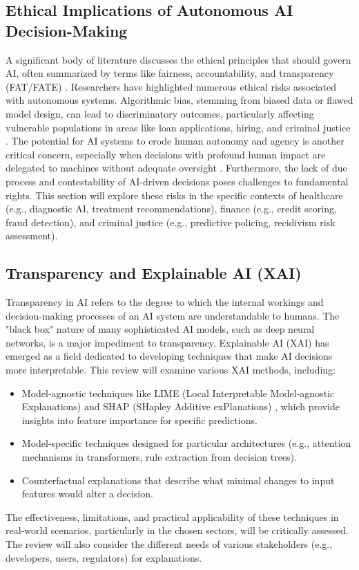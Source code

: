 \documentclass[english]{hogent-article}
\begin{document}
\subsection{Ethical Implications of Autonomous AI Decision-Making}
A significant body of literature discusses the ethical principles that should govern AI, often summarized by terms like fairness, accountability, and transparency (FAT/FATE) \autocite{Floridi2018}. Researchers have highlighted numerous ethical risks associated with autonomous systems. Algorithmic bias, stemming from biased data or flawed model design, can lead to discriminatory outcomes, particularly affecting vulnerable populations in areas like loan applications, hiring, and criminal justice \autocite{Noble2018}. The potential for AI systems to erode human autonomy and agency is another critical concern, especially when decisions with profound human impact are delegated to machines without adequate oversight \autocite{EuropeanCommission2021AIAct}. Furthermore, the lack of due process and contestability of AI-driven decisions poses challenges to fundamental rights. This section will explore these risks in the specific contexts of healthcare (e.g., diagnostic AI, treatment recommendations), finance (e.g., credit scoring, fraud detection), and criminal justice (e.g., predictive policing, recidivism risk assessment).

\subsection{Transparency and Explainable AI (XAI)}
Transparency in AI refers to the degree to which the internal workings and decision-making processes of an AI system are understandable to humans. The "black box" nature of many sophisticated AI models, such as deep neural networks, is a major impediment to transparency. Explainable AI (XAI) has emerged as a field dedicated to developing techniques that make AI decisions more interpretable. This review will examine various XAI methods, including:
\begin{itemize}
    \item Model-agnostic techniques like LIME (Local Interpretable Model-agnostic Explanations) \autocite{Ribeiro2016} and SHAP (SHapley Additive exPlanations) \autocite{Lundberg2017}, which provide insights into feature importance for specific predictions.
    \vfill
    \item Model-specific techniques designed for particular architectures (e.g., attention mechanisms in transformers, rule extraction from decision trees).
    \item Counterfactual explanations that describe what minimal changes to input features would alter a decision.
\end{itemize}
The effectiveness, limitations, and practical applicability of these techniques in real-world scenarios, particularly in the chosen sectors, will be critically assessed. The review will also consider the different needs of various stakeholders (e.g., developers, users, regulators) for explanations.
\end{document}
